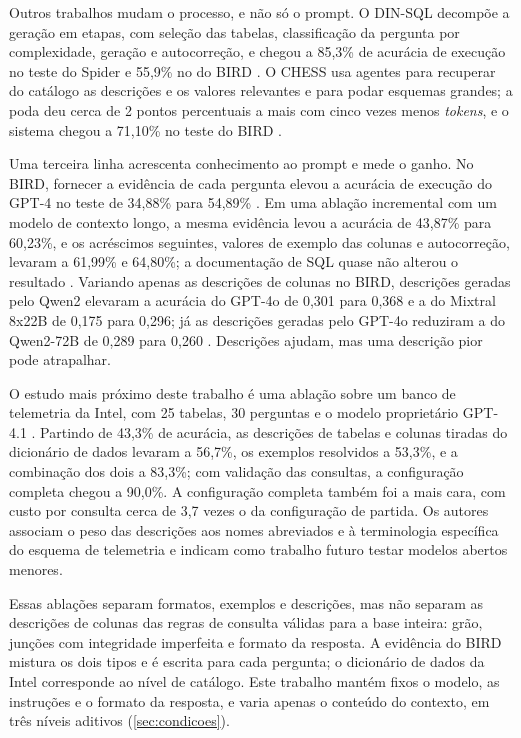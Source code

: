 Outros trabalhos mudam o processo, e não só o prompt. O DIN-SQL decompõe
a geração em etapas, com seleção das tabelas, classificação da pergunta
por complexidade, geração e autocorreção, e chegou a 85,3\% de acurácia
de execução no teste do Spider e 55,9\% no do BIRD
\cite{pourreza2023din}. O CHESS usa agentes para recuperar do catálogo as
descrições e os valores relevantes e para podar esquemas grandes; a poda
deu cerca de 2 pontos percentuais a mais com cinco vezes menos
\textit{tokens}, e o sistema chegou a 71,10\% no teste do BIRD
\cite{talaei2024chess}.

Uma terceira linha acrescenta conhecimento ao prompt e mede o ganho. No
BIRD, fornecer a evidência de cada pergunta elevou a acurácia de execução
do GPT-4 no teste de 34,88\% para 54,89\% \cite{li2023bird}. Em uma
ablação incremental com um modelo de contexto longo, a mesma evidência
levou a acurácia de 43,87\% para 60,23\%, e os acréscimos seguintes,
valores de exemplo das colunas e autocorreção, levaram a 61,99\% e
64,80\%; a documentação de SQL quase não alterou o resultado
\cite{chung2025longcontext}. Variando apenas as descrições de colunas no
BIRD, descrições geradas pelo Qwen2 elevaram a acurácia do GPT-4o de
0,301 para 0,368 e a do Mixtral 8x22B de 0,175 para 0,296; já as
descrições geradas pelo GPT-4o reduziram a do Qwen2-72B de 0,289 para
0,260 \cite{wretblad2024synthetic}. Descrições ajudam, mas uma descrição
pior pode atrapalhar.

O estudo mais próximo deste trabalho é uma ablação sobre um banco de
telemetria da Intel, com 25 tabelas, 30 perguntas e o modelo proprietário
GPT-4.1 \cite{bouattour2026prompting}. Partindo de 43,3\% de acurácia, as
descrições de tabelas e colunas tiradas do dicionário de dados levaram a
56,7\%, os exemplos resolvidos a 53,3\%, e a combinação dos dois a
83,3\%; com validação das consultas, a configuração completa chegou a
90,0\%. A configuração completa também foi a mais cara, com custo por
consulta cerca de 3,7 vezes o da configuração de partida. Os autores
associam o peso das descrições aos nomes abreviados e à terminologia
específica do esquema de telemetria e indicam como trabalho futuro
testar modelos abertos menores.

Essas ablações separam formatos, exemplos e descrições, mas não separam
as descrições de colunas das regras de consulta válidas para a base
inteira: grão, junções com integridade imperfeita e formato da resposta.
A evidência do BIRD mistura os dois tipos e é escrita para cada pergunta;
o dicionário de dados da Intel corresponde ao nível de catálogo. Este
trabalho mantém fixos o modelo, as instruções e o formato da resposta, e
varia apenas o conteúdo do contexto, em três níveis aditivos
(\autoref{sec:condicoes}).

